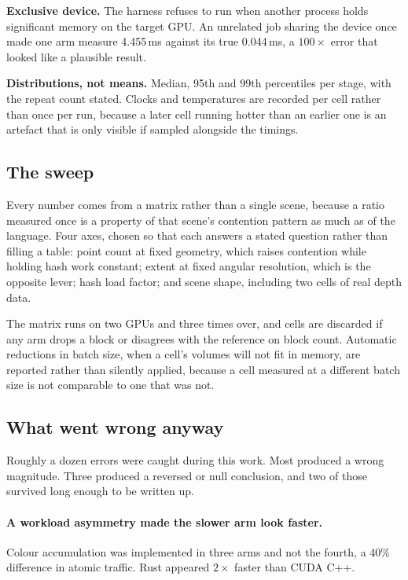 \documentclass[11pt]{article}
\begin{document}
\textbf{Exclusive device.} The harness refuses to run when another process holds
significant memory on the target GPU. An unrelated job sharing the device once
made one arm measure 4.455\,ms against its true 0.044\,ms, a $100\times$ error
that looked like a plausible result.

\textbf{Distributions, not means.} Median, 95th and 99th percentiles per stage,
with the repeat count stated. Clocks and temperatures are recorded per cell
rather than once per run, because a later cell running hotter than an earlier one
is an artefact that is only visible if sampled alongside the timings.

\subsection{The sweep}

Every number comes from a matrix rather than a single scene, because a ratio
measured once is a property of that scene's contention pattern as much as of the
language. Four axes, chosen so that each answers a stated question rather than
filling a table: point count at fixed geometry, which raises contention while
holding hash work constant; extent at fixed angular resolution, which is the
opposite lever; hash load factor; and scene shape, including two cells of real
depth data.

The matrix runs on two GPUs and three times over, and cells are discarded if any
arm drops a block or disagrees with the reference on block count. Automatic
reductions in batch size, when a cell's volumes will not fit in memory, are
reported rather than silently applied, because a cell measured at a different
batch size is not comparable to one that was not.

\subsection{What went wrong anyway}

Roughly a dozen errors were caught during this work. Most produced a wrong
magnitude. Three produced a reversed or null conclusion, and two of those survived
long enough to be written up.

\paragraph{A workload asymmetry made the slower arm look faster.} Colour
accumulation was implemented in three arms and not the fourth, a 40\% difference
in atomic traffic. Rust appeared $2\times$ faster than CUDA C++.
\end{document}
